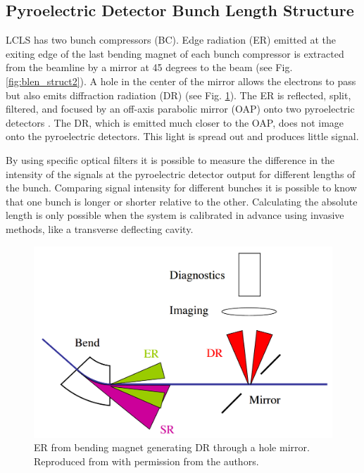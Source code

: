 \documentclass[letter,
        biblatex,   %
        keeplastbox,  %
        ]{jacow}
\begin{document}
\subsection{Pyroelectric Detector Bunch Length Structure}
LCLS has two bunch compressors (BC). Edge radiation (ER) emitted at the exiting edge of the last bending magnet of each bunch compressor is extracted from the beamline by a mirror at 45 degrees to the beam (see Fig. \ref{fig:blen_struct2}). A hole in the center of the mirror allows the electrons to pass but also emits diffraction radiation (DR) (see Fig. \ref{fig:blen_struct1}). The ER is reflected, split, filtered, and focused by an off-axis parabolic mirror (OAP) onto two pyroelectric detectors \cite{blen-pac07}. The DR, which is emitted much closer to the OAP, does not image onto the pyroelectric detectors. This light is spread out and produces little signal.

By using specific optical filters it is possible to measure the difference in the intensity of the signals at the pyroelectric detector output for different lengths of the bunch. Comparing signal intensity for different bunches it is possible to know that one bunch is longer or shorter relative to the other. Calculating the absolute length is only possible when the system is calibrated in advance using invasive methods, like a transverse deflecting cavity. \cite{blen-pac07}

\begin{figure}[!htb]
  \centering
  \includegraphics*[width=\columnwidth]{BunchLengthStruct_1}
  \caption{ER from bending magnet generating DR through a hole mirror. Reproduced from \cite{blen-pac07} with permission from the authors.}
  \label{fig:blen_struct1}
\end{figure}
\end{document}
